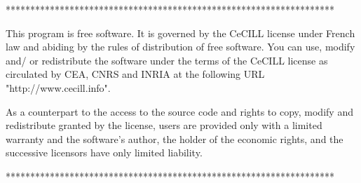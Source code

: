\documentclass[11pt,a4paper]{report}
\begin{document}
\vspace*{7cm}

\begin{minipage}{0.8\linewidth}
{\color[named]{Brown} \sl

\noindent
*******************************************************************

\noindent This program is free software. It is governed by the CeCILL license under French law and
abiding by the rules of distribution of free software. You can  use, modify and/ or redistribute
the software under the terms of the CeCILL license as circulated by CEA, CNRS and INRIA at the
following URL "http://www.cecill.info".

\noindent As a counterpart to the access to the source code and rights to copy, modify and
redistribute granted by the license, users are provided only with a limited warranty and the
software's author, the holder of the economic rights, and the successive licensors have only
limited liability.

\noindent
*******************************************************************
}
\end{minipage}

\newpage

\pagestyle{fancy}
\renewcommand{\sectionmark}[1]{\markright{#1}{}}




\parskip 0.1cm
{\small \tableofcontents }
\parskip 0.4cm

\newpage



\newpage



\newpage



\newpage




\newpage



\newpage



\end{document}
